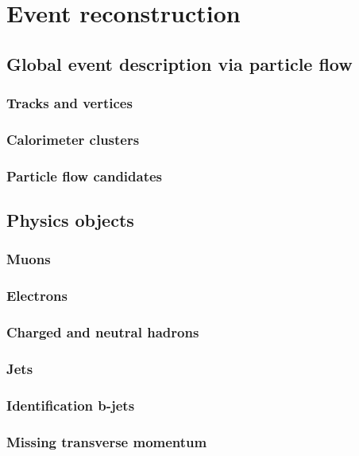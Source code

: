 \chapter{Event reconstruction}
\label{ch:eventreconstruction}
\section{Global event description via particle flow}
  \subsection{Tracks and vertices}
  \subsection{Calorimeter clusters}
  \subsection{Particle flow candidates}
\section{Physics objects}
  \subsection{Muons}
  \subsection{Electrons}
  \subsection{Charged and neutral hadrons}
  \subsection{Jets}
  \subsection{Identification b-jets}
  \subsection{Missing transverse momentum}

